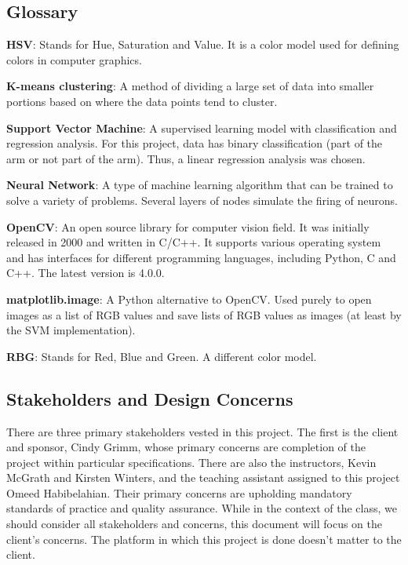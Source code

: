 \documentclass[10pt,journal,compsoc, draftclsnofoot,onecolumn]{IEEEtran}
\begin{document}
\subsection{Glossary}
\textbf{HSV}: Stands for Hue, Saturation and Value. It is a color model used for defining colors in computer graphics.

\noindent
\textbf{K-means clustering}: A method of dividing a large set of data into smaller portions based on where the data points tend to cluster.

\noindent
\textbf{Support Vector Machine}: A supervised learning model with classification and regression analysis.
For this project, data has binary classification (part of the arm or not part of the arm).
Thus, a linear regression analysis was chosen.

\noindent
\textbf{Neural Network}: A type of machine learning algorithm that can be trained to solve a variety of problems. Several layers of nodes simulate the firing of neurons.

\noindent
\textbf{OpenCV}: An open source library for computer vision field.
It was initially released in 2000 and written in C/C++.
It supports various operating system and has interfaces for different programming languages, including Python, C and C++. The latest version is 4.0.0.

\noindent
\textbf{matplotlib.image}: A Python alternative to OpenCV.
Used purely to open images as a list of RGB values and save lists of RGB values as images (at least by the SVM implementation).

\noindent
\textbf{RBG}: Stands for Red, Blue and Green. A different color model.

\subsection{Stakeholders and Design Concerns}
There are three primary stakeholders vested in this project.
The first is the client and sponsor, Cindy Grimm, whose primary concerns are completion of the project within particular specifications.
There are also the instructors, Kevin McGrath and Kirsten Winters, and the teaching assistant assigned to this project Omeed Habibelahian.
Their primary concerns are upholding mandatory standards of practice and quality assurance.
While in the context of the class, we should consider all stakeholders and concerns, this document will focus on the client's concerns.
The platform in which this project is done doesn't matter to the client.
\end{document}
